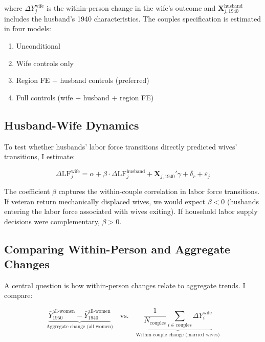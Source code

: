 \documentclass[12pt]{article}
\begin{document}
\noindent where $\Delta Y_j^{\text{wife}}$ is the within-person change in the wife's outcome and $\mathbf{X}_{j,1940}^{\text{husband}}$ includes the husband's 1940 characteristics. The couples specification is estimated in four models:

\begin{enumerate}
\item[W1.] Unconditional
\item[W2.] Wife controls only
\item[W3.] Region FE + husband controls (preferred)
\item[W4.] Full controls (wife + husband + region FE)
\end{enumerate}

\subsection{Husband-Wife Dynamics}

To test whether husbands' labor force transitions directly predicted wives' transitions, I estimate:

\begin{equation}
\Delta \text{LF}_j^{\text{wife}} = \alpha + \beta \cdot \Delta \text{LF}_j^{\text{husband}} + \mathbf{X}_{j,1940}' \gamma + \delta_r + \varepsilon_j
\label{eq:hw_dynamics}
\end{equation}

\noindent The coefficient $\beta$ captures the within-couple correlation in labor force transitions. If veteran return mechanically displaced wives, we would expect $\beta < 0$ (husbands entering the labor force associated with wives exiting). If household labor supply decisions were complementary, $\beta > 0$.

\subsection{Comparing Within-Person and Aggregate Changes}

A central question is how within-person changes relate to aggregate trends. I compare:

\begin{equation}
\underbrace{\bar{Y}^{\text{all-women}}_{1950} - \bar{Y}^{\text{all-women}}_{1940}}_{\text{Aggregate change (all women)}} \quad \text{vs.} \quad \underbrace{\frac{1}{N_{\text{couples}}} \sum_{i \in \text{couples}} \Delta Y_i^{\text{wife}}}_{\text{Within-couple change (married wives)}}
\label{eq:decomp}
\end{equation}
\end{document}
